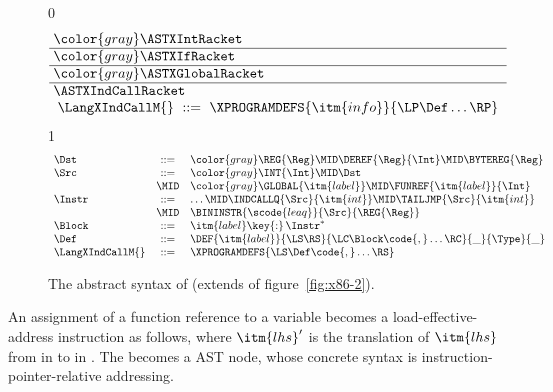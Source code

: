 \documentclass[7x10]{TimesAPriori_MIT}%
\newcommand{\gray}[1]{{\color{gray} #1}}
\def\racketEd{0}
\def\pythonEd{1}
\providecommand{\BookEdition}{1}
\let\edition\BookEdition
\newcommand{\pythonColor}[0]{}
\numberwithin{theorem}{chapter}
\numberwithin{definition}{chapter}
\numberwithin{equation}{chapter}
\begin{document}
\begin{figure}[tp]
  \begin{tcolorbox}[colback=white]
    \small
{\if\edition\racketEd
\[\arraycolsep=3pt
\begin{array}{l}
  \gray{\ASTXIntRacket} \\ \hline
  \gray{\ASTXIfRacket} \\ \hline
  \gray{\ASTXGlobalRacket} \\ \hline
  \ASTXIndCallRacket \\
\begin{array}{lcl}
\LangXIndCallM{} &::= & \XPROGRAMDEFS{\itm{info}}{\LP\Def\ldots\RP}
\end{array}
\end{array}
\]
\fi}
{\if\edition\pythonEd\pythonColor
\[
\begin{array}{lcl}
  \Dst &::=&  \gray{  \REG{\Reg} \MID \DEREF{\Reg}{\Int}
     \MID \BYTEREG{\Reg} } \\
  \Src &::=&  \gray{  \INT{\Int} \MID \Dst } \\
     &\MID& \gray{ \GLOBAL{\itm{label}} } \MID \FUNREF{\itm{label}}{\Int} \\
  \Instr &::=& \ldots \MID \INDCALLQ{\Src}{\itm{int}}
    \MID \TAILJMP{\Src}{\itm{int}}\\
    &\MID& \BININSTR{\scode{leaq}}{\Src}{\REG{\Reg}}\\
  \Block &::=&\itm{label}\key{:}\,\Instr^{*} \\
  \Def &::= & \DEF{\itm{label}}{\LS\RS}{\LC\Block\code{,}\ldots\RC}{\_}{\Type}{\_} \\
\LangXIndCallM{} &::= & \XPROGRAMDEFS{\LS\Def\code{,}\ldots\RS}
\end{array}
\]
\fi}
  \end{tcolorbox}
\caption{The abstract syntax of \LangXIndCall{} (extends
  \LangXGlobal{} of figure~\ref{fig:x86-2}).}
\label{fig:x86-3}
\end{figure}

An assignment of a function reference to a variable becomes a
load-effective-address instruction as follows, where $\itm{lhs}'$ is
the translation of $\itm{lhs}$ from \Atm{} in \LangCFun{} to \Src{} in
\LangXIndCallVar{}. The  becomes a  AST
node, whose concrete syntax is instruction-pointer-relative
addressing.
\end{document}
